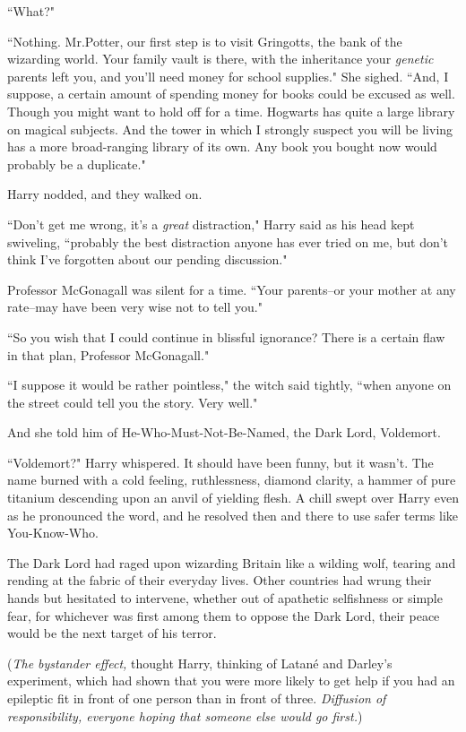 ``What?"

``Nothing. Mr.\?Potter, our first step is to visit Gringotts, the bank of the wizarding world. Your family vault is there, with the inheritance your \emph{genetic} parents left you, and you'll need money for school supplies." She sighed. ``And, I suppose, a certain amount of spending money for books could be excused as well. Though you might want to hold off for a time. Hogwarts has quite a large library on magical subjects. And the tower in which I strongly suspect you will be living has a more broad-ranging library of its own. Any book you bought now would probably be a duplicate."

Harry nodded, and they walked on.

``Don't get me wrong, it's a \emph{great} distraction," Harry said as his head kept swiveling, ``probably the best distraction anyone has ever tried on me, but don't think I've forgotten about our pending discussion."

Professor McGonagall was silent for a time. ``Your parents\---or your mother at any rate\---may have been very wise not to tell you."

``So you wish that I could continue in blissful ignorance? There is a certain flaw in that plan, Professor McGonagall."

``I suppose it would be rather pointless," the witch said tightly, ``when anyone on the street could tell you the story. Very well."

And she told him of He-Who-Must-Not-Be-Named, the Dark Lord, Voldemort.

``Voldemort?" Harry whispered. It should have been funny, but it wasn't. The name burned with a cold feeling, ruthlessness, diamond clarity, a hammer of pure titanium descending upon an anvil of yielding flesh. A chill swept over Harry even as he pronounced the word, and he resolved then and there to use safer terms like You-Know-Who.

The Dark Lord had raged upon wizarding Britain like a wilding wolf, tearing and rending at the fabric of their everyday lives. Other countries had wrung their hands but hesitated to intervene, whether out of apathetic selfishness or simple fear, for whichever was first among them to oppose the Dark Lord, their peace would be the next target of his terror.

(\emph{The bystander effect,} thought Harry, thinking of Latané and Darley's experiment, which had shown that you were more likely to get help if you had an epileptic fit in front of one person than in front of three. \emph{Diffusion of responsibility, everyone hoping that someone else would go first.})

